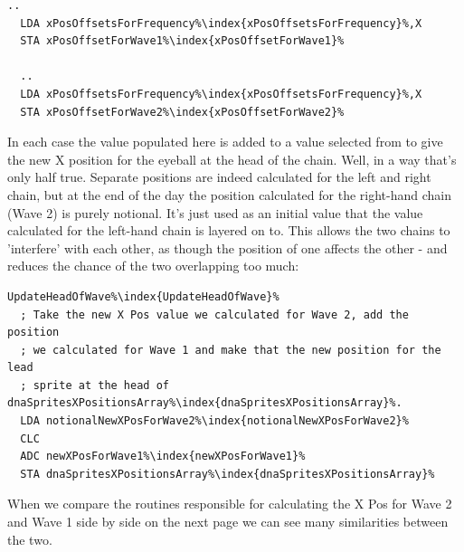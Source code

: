 \begin{lstlisting}[escapechar=\%]
  ..
  LDA xPosOffsetsForFrequency%\index{xPosOffsetsForFrequency}%,X
  STA xPosOffsetForWave1%\index{xPosOffsetForWave1}%

  ..
  LDA xPosOffsetsForFrequency%\index{xPosOffsetsForFrequency}%,X
  STA xPosOffsetForWave2%\index{xPosOffsetForWave2}%
\end{lstlisting}

In each case the value populated here is added to a value selected from  to give the 
new X position for the eyeball at the head of the chain. Well, in a way that's only half true. Separate positions
are indeed calculated for the left and right chain, but at the end of the day the position calculated for the right-hand
chain (Wave 2) is purely notional. It's just used as an initial value that the value calculated for the left-hand chain
is layered on to. This allows the two chains to 'interfere' with each other, as though the position of one affects the
other - and reduces the chance of the two overlapping too much:

\begin{lstlisting}[caption=From \icode{CalculateValueOfNewXPosForWave1},escapechar=\%]
UpdateHeadOfWave%\index{UpdateHeadOfWave}%   
  ; Take the new X Pos value we calculated for Wave 2, add the position
  ; we calculated for Wave 1 and make that the new position for the lead
  ; sprite at the head of dnaSpritesXPositionsArray%\index{dnaSpritesXPositionsArray}%.
  LDA notionalNewXPosForWave2%\index{notionalNewXPosForWave2}%
  CLC
  ADC newXPosForWave1%\index{newXPosForWave1}%
  STA dnaSpritesXPositionsArray%\index{dnaSpritesXPositionsArray}%
\end{lstlisting}

When we compare the routines responsible for calculating the X Pos for Wave 2 and Wave 1 side by side on the next
page we can see many similarities between the two.

